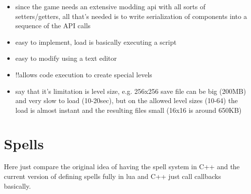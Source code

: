 \begin{itemize}
    \item since the game needs an extensive modding api with all sorts of setters/getters,
	    all that's needed is to write serialization of components into a sequence of
	    the API calls
    \item easy to implement, load is basically executing a script
    \item easy to modify using a text editor
    \item !!allows code execution to create special levels
    \item say that it's limitation is level size, e.g. 256x256 save file can be big (200MB) and
	    very slow to load (10-20sec), but on the allowed level sizes (10-64) the load
	    is almost instant and the resulting files small (16x16 is around 650KB)
\end{itemize}

\section{Spells}

Here just compare the original idea of having the spell system in C++ and the current version
of defining spells fully in lua and C++ just call callbacks basically.
